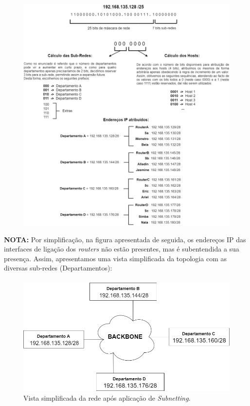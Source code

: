     \begin{figure}[H]
    \centering
    \includegraphics[width=500pt]{images/ParteII/Questao3/Questao3-ParteII-RC-Questao3.drawio.png}
    \label{parteII-questao3-subnetting}
    \end{figure}
    
    \par \textbf{NOTA:} Por simplificação, na figura apresentada de seguida, os endereços IP das interfaces de ligação dos \textit{routers} não estão presentes, mas é subentendida a sua presença. Assim, apresentamos uma vista simplificada da topologia com as diversas sub-redes (Departamentos):
    \paragraph{}
    \begin{figure}[H]
    \centering
    \includegraphics[width=450pt]{images/ParteII/Questao3/Questao3-Topologia.png}
    \caption{Vista simplificada da rede após aplicação de \textit{Subnetting}.}
    \label{parteII-questao3-topologia}
    \end{figure}
    
